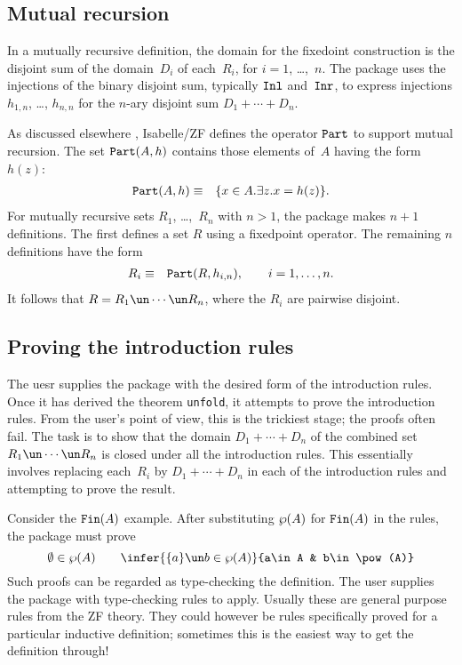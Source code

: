 \subsection{Mutual recursion} \label{mutual-sec}
In a mutually recursive definition, the domain for the fixedoint construction
is the disjoint sum of the domain~$D_i$ of each~$R_i$, for $i=1$,
\ldots,~$n$.  The package uses the injections of the
binary disjoint sum, typically ${\tt Inl}$ and~${\tt Inr}$, to express injections
$h_{1,n}$, \ldots, $h_{n,n}$ for the $n$-ary disjoint sum $D_1+\cdots+D_n$.

As discussed elsewhere \cite[\S4.5]{paulson-set-II}, Isabelle/ZF defines the
operator ${\tt Part}$ to support mutual recursion.  The set ${\tt Part}(A,h)$
contains those elements of~$A$ having the form~$h(z)$:
\begin{eqnarray*}
   {\tt Part}(A,h)  & \equiv & \{x\in A. \exists z. x=h(z)\}.
\end{eqnarray*}   
For mutually recursive sets $R_1$, \ldots,~$R_n$ with
$n>1$, the package makes $n+1$ definitions.  The first defines a set $R$ using
a fixedpoint operator. The remaining $n$ definitions have the form
\begin{eqnarray*}
  R_i & \equiv & {\tt Part}(R,h_{i,n}), \qquad i=1,\ldots, n.
\end{eqnarray*} 
It follows that $R=R_1\un\cdots\un R_n$, where the $R_i$ are pairwise disjoint.


\subsection{Proving the introduction rules}
The uesr supplies the package with the desired form of the introduction
rules.  Once it has derived the theorem {\tt unfold}, it attempts
to prove the introduction rules.  From the user's point of view, this is the
trickiest stage; the proofs often fail.  The task is to show that the domain 
$D_1+\cdots+D_n$ of the combined set $R_1\un\cdots\un R_n$ is
closed under all the introduction rules.  This essentially involves replacing
each~$R_i$ by $D_1+\cdots+D_n$ in each of the introduction rules and
attempting to prove the result.

Consider the ${\tt Fin}(A)$ example.  After substituting $\wp(A)$ for ${\tt Fin}(A)$
in the rules, the package must prove
\[  \emptyset\in\pow(A)  \qquad 
    \infer{\{a\}\un b\in\pow(A)}{a\in A & b\in\pow(A)} 
\]
Such proofs can be regarded as type-checking the definition.  The user
supplies the package with type-checking rules to apply.  Usually these are
general purpose rules from the ZF theory.  They could however be rules
specifically proved for a particular inductive definition; sometimes this is
the easiest way to get the definition through!

